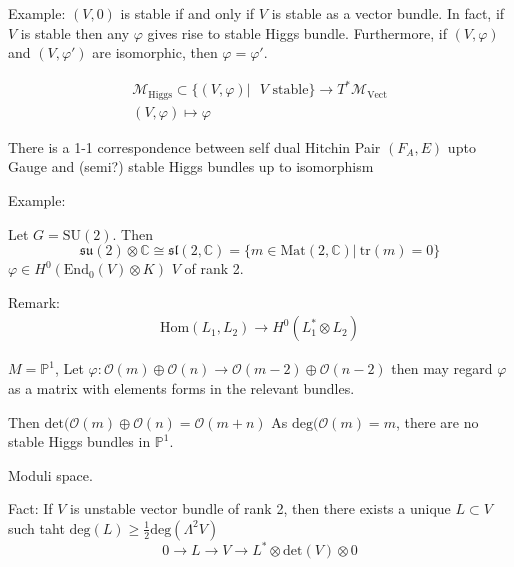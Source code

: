Example: $(V,0)$ is stable if and only if $ V$ is stable as a vector bundle. 
In fact, if $ V$ is stable then any $\varphi$ gives rise to stable Higgs bundle. 
Furthermore, if $(V, \varphi)$ and $(V, \varphi') $ are isomorphic, then $ \varphi = \varphi'$.

\begin{align}
    \mathcal{M}_{\mathrm{Higgs}} \subset \{ ( V,\varphi) | \mbox{ $V$ stable} \} \rightarrow T^* \mathcal{M}_{\mathrm{Vect}} \\
    ( V, \varphi) \mapsto \varphi 
\end{align}

There is a 1-1 correspondence between self dual  Hitchin Pair $(F_A , E) $ upto Gauge 
and (semi?) stable Higgs bundles up to isomorphism 

Example: 

Let $ G = \mathrm{SU}(2) $. 
Then 
\begin{equation}
    \mathfrak{su}(2) \otimes \mathbb{C}  \cong \mathfrak{sl}(2, \mathbb{C} ) = \{ m \in \mathrm{Mat}(2, \mathbb{C} )| ~ \mathrm{tr}(m) = 0 \}
\end{equation}
$ \varphi \in H^0 ( \mathrm{End} _0 ( V) \otimes K) $ 
$V$ of rank 2. 

Remark: 
\begin{align}
    \mathrm{Hom} ( L_1 , L_2 ) \rightarrow  H^0 ( L_1 ^* \otimes L_2 ) 
\end{align}

$M = \mathbb{P} ^1 $, %
Let $ \varphi: \mathcal{O} ( m) \oplus \mathcal{O} ( n) \rightarrow  \mathcal{O} (m -2) \oplus \mathcal{O} (n-2) $ 
then may regard $\varphi $ as a matrix with elements forms in the relevant bundles. 

Then $ \mathrm{det}(\mathcal{O} ( m) \oplus \mathcal{O} (n) = \mathcal{O} (m+n) $
As $ \mathrm{deg}( \mathcal{O} (m) = m $, there are no stable Higgs bundles in $\mathbb{P} ^1$. 

Moduli space. 

Fact: If $V$ is unstable vector bundle of rank 2, 
then there exists a unique $L \subset V$ such taht 
$ \mathrm{deg}(L) \geq \frac{1}{2} \mathrm{deg} (\Lambda^2 V ) $ 
\begin{equation}
    0 \rightarrow  L \rightarrow V \rightarrow  L^* \otimes \mathrm{det} (V) \otimes 0 
\end{equation}

